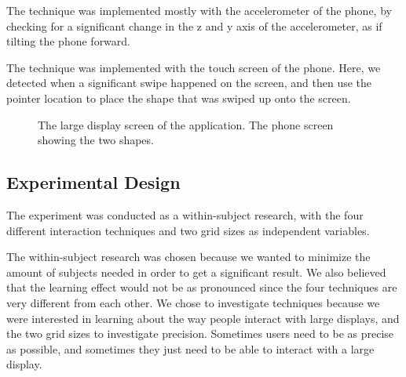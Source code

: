 The \tilt technique was implemented mostly with the accelerometer of the phone, by checking for a significant change in the z and y axis of the accelerometer, as if tilting the phone forward. 

The \swipe technique was implemented with the touch screen of the phone. 
Here, we detected when a significant swipe happened on the screen, and then use the pointer location to place the shape that was swiped up onto the screen. 

\begin{figure}[H]
	\centering
	\qquad
	\caption{
		\protect{} The large display screen of the application.
		\protect{} The phone screen showing the two shapes.
	}
	\label{fig:allSetup}
\end{figure} 

\subsection{Experimental Design}\label{sec:expdesign}
The experiment was conducted as a within-subject research, with the four different interaction techniques and two grid sizes as independent variables. 

The within-subject research was chosen because we wanted to minimize the amount of subjects needed in order to get a significant result. We also believed that the learning effect would not be as pronounced since the four techniques are very different from each other. 
We chose to investigate techniques because we were interested in learning about the way people interact with large displays, and the two grid sizes to investigate precision. Sometimes users need to be as precise as possible, and sometimes they just need to be able to interact with a large display. 

